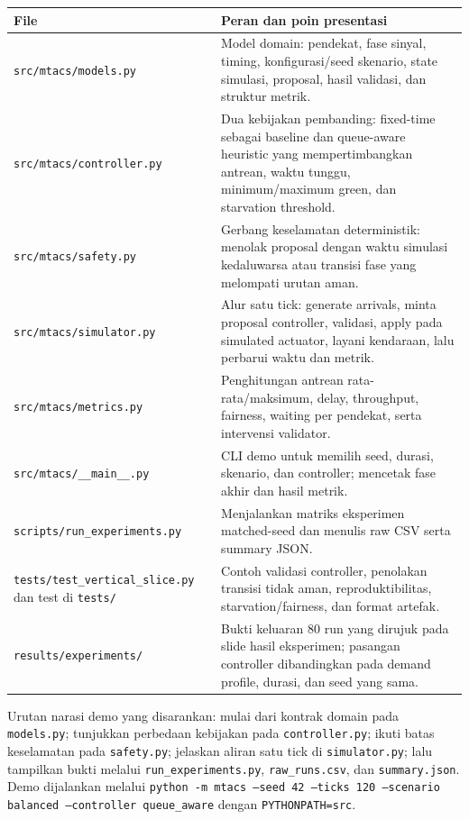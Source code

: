 \documentclass[12pt]{article}
\begin{document}
\begin{longtable}{p{} p{}}
\toprule
\textbf{File} & \textbf{Peran dan poin presentasi}\\
\midrule
\texttt{src/mtacs/models.py} & Model domain: pendekat, fase sinyal, timing, konfigurasi/seed skenario, state simulasi, proposal, hasil validasi, dan struktur metrik.\\
\texttt{src/mtacs/controller.py} & Dua kebijakan pembanding: fixed-time sebagai baseline dan queue-aware heuristic yang mempertimbangkan antrean, waktu tunggu, minimum/maximum green, dan starvation threshold.\\
\texttt{src/mtacs/safety.py} & Gerbang keselamatan deterministik: menolak proposal dengan waktu simulasi kedaluwarsa atau transisi fase yang melompati urutan aman.\\
\texttt{src/mtacs/simulator.py} & Alur satu tick: generate arrivals, minta proposal controller, validasi, apply pada simulated actuator, layani kendaraan, lalu perbarui waktu dan metrik.\\
\texttt{src/mtacs/metrics.py} & Penghitungan antrean rata-rata/maksimum, delay, throughput, fairness, waiting per pendekat, serta intervensi validator.\\
\texttt{src/mtacs/\_\_main\_\_.py} & CLI demo untuk memilih seed, durasi, skenario, dan controller; mencetak fase akhir dan hasil metrik.\\
\texttt{scripts/run\_experiments.py} & Menjalankan matriks eksperimen matched-seed dan menulis raw CSV serta summary JSON.\\
\texttt{tests/}\newline\texttt{test\_vertical\_slice.py} dan test di \texttt{tests/} & Contoh validasi controller, penolakan transisi tidak aman, reproduktibilitas, starvation/fairness, dan format artefak.\\
\texttt{results/experiments/} & Bukti keluaran 80 run yang dirujuk pada slide hasil eksperimen; pasangan controller dibandingkan pada demand profile, durasi, dan seed yang sama.\\
\bottomrule
\end{longtable}

Urutan narasi demo yang disarankan: mulai dari kontrak domain pada \texttt{models.py}; tunjukkan perbedaan kebijakan pada \texttt{controller.py}; ikuti batas keselamatan pada \texttt{safety.py}; jelaskan aliran satu tick di \texttt{simulator.py}; lalu tampilkan bukti melalui \texttt{run\_experiments.py}, \texttt{raw\_runs.csv}, dan \texttt{summary.json}. Demo dijalankan melalui \texttt{python -m mtacs --seed 42 --ticks 120 --scenario balanced --controller queue\_aware} dengan \texttt{PYTHONPATH=src}.
\end{document}
